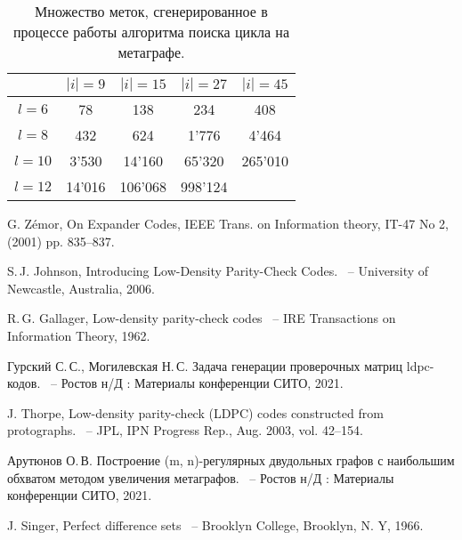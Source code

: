 \documentclass[14pt]{mmcs-article}
\begin{document}
\begin{table}[H]
    \centering
    \begin{tabular}{ | c | c | c | c | c | }
        \hline
                   & $|i| = 9$         & $|i| = 15$        & $|i| = 27$      & $|i| = 45$  \\ \hline
        $ l = 6 $  & 78               & 138               & 234           & 408       \\ \hline
        $ l = 8 $  & 432               & 624             & 1'776          & 4'464      \\ \hline
        $ l = 10 $ & 3'530             & 14'160            & 65'320         & 265'010   \\ \hline
        $ l = 12 $ & 14'016             & 106'068            & 998'124          &             \\ \hline
    \end{tabular}
    \caption{ Множество меток, сгенерированное в процессе работы алгоритма поиска цикла на метаграфе. }
    \label{cycle_search_table}
\end{table}

\newpage

\renewcommand{\refname}{\centering \textbf{Литература}}

\begin{thebibliography}{0}

G. Zémor, On Expander Codes, IEEE Trans. on Information theory, IT-47
No 2, (2001) pp. 835–837.
  
S.\,J. Johnson,
Introducing Low-Density Parity-Check Codes.
~-- University of Newcastle, Australia, 2006.

R.\,G. Gallager,
Low-density parity-check codes
~-- IRE Transactions on Information Theory, 1962.

Гурский С.\,С., Могилевская Н.\,С.
Задача генерации проверочных матриц ldpc-кодов.
~-- Ростов н/Д : Материалы конференции СИТО, 2021.

J. Thorpe,
Low-density parity-check (LDPC) codes constructed from protographs.
~-- JPL, IPN Progress Rep., Aug. 2003, vol. 42–154.

Арутюнов О.\,В.
Построение (m, n)-регулярных двудольных графов с наибольшим обхватом методом увеличения метаграфов.
~-- Ростов н/Д : Материалы конференции СИТО, 2021.

J. Singer,
Perfect difference sets
~-- Brooklyn College, Brooklyn, N. Y, 1966.

\end{thebibliography}
\end{document}

